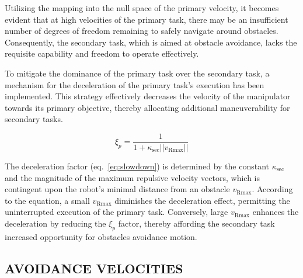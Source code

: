 \documentclass[letterpaper, 10 pt, conference]{ieeeconf}  %
\begin{document}
Utilizing the mapping into the null space of the primary velocity, it becomes evident that at high velocities of the primary task, there may be an insufficient number of degrees of freedom remaining to safely navigate around obstacles. Consequently, the secondary task, which is aimed at obstacle avoidance, lacks the requisite capability and freedom to operate effectively.

\label{chap:primary slowdown}

To mitigate the dominance of the primary task over the secondary task, a mechanism for the deceleration of the primary task's execution has been implemented. This strategy effectively decreases the velocity of the manipulator towards its primary objective, thereby allocating additional maneuverability for secondary tasks.

\begin{equation}
	\label{eq:slowdown}
	\xi_{p}=
	\frac{1}{1 + \kappa_{\text{sec}} ||v_{\text{Rmax}}||}
\end{equation}

The deceleration factor (eq.~\ref{eq:slowdown}) is determined by the constant \( \kappa_{\text{sec}} \) and the magnitude of the maximum repulsive velocity vectors, which is contingent upon the robot's minimal distance from an obstacle \( v_{\text{Rmax}} \). According to the equation, a small \( v_{\text{Rmax}} \) diminishes the deceleration effect, permitting the uninterrupted execution of the primary task. Conversely, large \( v_{\text{Rmax}} \) enhances the deceleration by reducing the $\xi_{p}$ factor, thereby affording the secondary task increased opportunity for obstacles avoidance motion.


\subsection{AVOIDANCE VELOCITIES}
\end{document}
